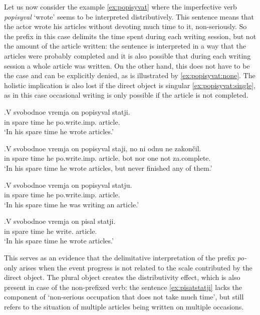 Let us now consider the example \ref{ex:popisyvat} where the imperfective verb \textit{popisyval} `wrote' seems to be interpreted distributively. This sentence means that the actor wrote his articles without devoting much time to it, non-seriously. So the prefix in this case delimits the time spent during each writing session, but not the amount of the article written: the sentence is interpreted in a way that the articles were probably completed and it is also possible that during each writing session a whole article was written. On the other hand, this does not have to be the case and can be explicitly denied, as is illustrated by \ref{ex:popisyvat:none}. The holistic implication is also lost if the direct object is singular \ref{ex:popisyvat:single}, as in this case occasional writing is only possible if the article is not completed. 

\exg.\label{ex:popisyvat}V svobodnoe vremja on popisyval statji.\\
in spare time he po.write.imp. article.\\
\vspace{0.5em}
`In his spare time he wrote articles.'

\exg.\label{ex:popisyvat:none}V svobodnoe vremja on popisyval staji, no ni odnu ne zakon\v{c}il.\\
in spare time he po.write.imp. article. bot nor one not za.complete.\\
\vspace{0.5em}
`In his spare time he wrote articles, but never finished any of them.'

\exg.\label{ex:popisyvat:single}V svobodnoe vremja on popisyval statju.\\
in spare time he po.write.imp. article.\\
\vspace{0.5em}
`In his spare time he was writing an article.'

\exg.\label{ex:pisatstatji}V svobodnoe vremja on pisal statji.\\
in spare time he write. article.\\
\vspace{0.5em}
`In his spare time he wrote articles.'

This serves as an evidence that the delimitative interpretation of the prefix \textit{po-} only arises when the event progress is not related to the scale contributed by the direct object. The plural object creates the distributivity effect, which is also present in case of the non-prefixed verb: the sentence \ref{ex:pisatstatji} lacks the component of `non-serious occupation that does not take much time', but still refers to the situation of multiple articles being written on multiple occasions. 

